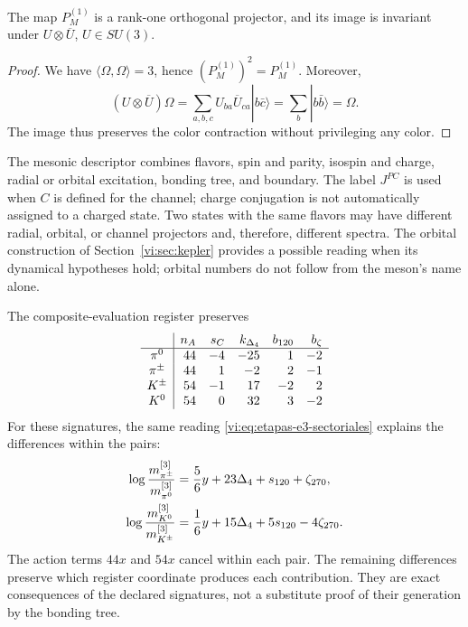 \begin{proposition}
The map \(P_M^{(1)}\) is a rank-one orthogonal projector, and
its image is invariant under \(U\otimes\overline U\), \(U\in SU(3)\).
\end{proposition}
\begin{proof}
We have \(\langle\Omega,\Omega\rangle=3\), hence
\((P_M^{(1)})^2=P_M^{(1)}\). Moreover,
\[
 (U\otimes\overline U)\Omega
 =\sum_{a,b,c}U_{ba}\overline U_{ca}|b\bar c\rangle
 =\sum_b|b\bar b\rangle=\Omega.
\]
The image thus preserves the color contraction without privileging any color.
\end{proof}

The mesonic descriptor combines flavors, spin and parity, isospin and charge,
radial or orbital excitation, bonding tree, and boundary. The label
\(J^{PC}\) is used when \(C\) is defined for the channel; charge
conjugation is not automatically assigned to a charged state. Two
states with the same flavors may have different radial,
orbital, or channel projectors and, therefore, different spectra. The
orbital construction of Section~\ref{vi:sec:kepler} provides a
possible reading when its dynamical hypotheses hold; orbital
numbers do not follow from the meson's name alone.

The composite-evaluation register preserves
\[
\begin{array}{c|r r r r r}
 &n_A&s_C&k_{\Delta_4}&b_{120}&b_\zeta\\\hline
 \pi^0&44&-4&-25&1&-2\\
 \pi^\pm&44&1&-2&2&-1\\
 K^\pm&54&-1&17&-2&2\\
 K^0&54&0&32&3&-2
\end{array}
\]
For these signatures, the same reading \eqref{vi:eq:etapas-e3-sectoriales}
explains the differences within the pairs:
\begin{align}
 \log\frac{m_{\pi^\pm}^{[3]}}{m_{\pi^0}^{[3]}}
 &=\frac56y+23\Delta_4+s_{120}+\zeta_{270},\notag\\
 \log\frac{m_{K^0}^{[3]}}{m_{K^\pm}^{[3]}}
 &=\frac16y+15\Delta_4+5s_{120}-4\zeta_{270}.
 \label{vi:eq:desdoblamientos-mesonicos}
\end{align}
The action terms \(44x\) and \(54x\) cancel within
each pair. The remaining differences preserve which register coordinate
produces each contribution. They are exact consequences of the
declared signatures, not a substitute proof of their generation by the
bonding tree.

